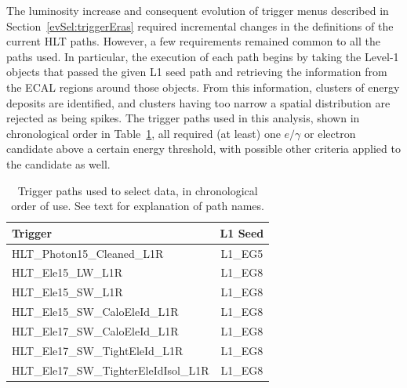 The luminosity increase and consequent evolution of trigger menus 
described in Section~\ref{evSel:triggerEras} required incremental changes 
in the definitions of the current HLT paths.  
However, a few requirements remained common to all the paths used.  
In particular, the execution of each path begins by taking 
the Level-1 objects that passed the given L1 seed path 
and retrieving the information from the ECAL regions %
around those objects.  
From this information, 
clusters of energy deposits are identified, 
and clusters having too narrow a spatial distribution are 
rejected as being spikes.  
The trigger paths used in this analysis, 
shown in chronological order in Table~\ref{TableTriggerPaths}, 
all required (at least) one 
$e/\gamma$ or electron candidate above a certain energy threshold, 
with possible other criteria applied to the candidate as well.%

\begin{table}[htbp]
  \begin{center}
    \caption[Trigger paths used to select data]
    {\fixspacing Trigger paths used to select data, 
    in chronological order of use. 
    See text for explanation of path names.  
    }
    \label{TableTriggerPaths}
    \begin{tabular}[]{ | l | c | }
      \hline
      Trigger & L1 Seed \\ \hline \hline
      HLT\_Photon15\_Cleaned\_L1R & L1\_EG5 \\ \hline
      HLT\_Ele15\_LW\_L1R & L1\_EG8 \\ \hline
      HLT\_Ele15\_SW\_L1R & L1\_EG8 \\ \hline
      HLT\_Ele15\_SW\_CaloEleId\_L1R & L1\_EG8 \\ \hline
      HLT\_Ele17\_SW\_CaloEleId\_L1R & L1\_EG8 \\ \hline
      HLT\_Ele17\_SW\_TightEleId\_L1R & L1\_EG8 \\ \hline
      HLT\_Ele17\_SW\_TighterEleIdIsol\_L1R & L1\_EG8 \\ \hline
    \end{tabular}
  \end{center}
\end{table}


